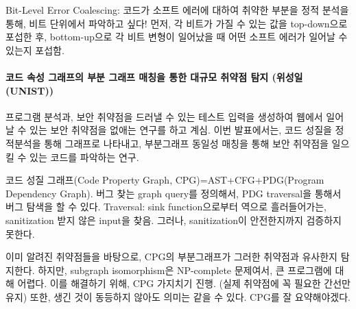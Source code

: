 \documentclass{article}
\begin{document}
Bit-Level Error Coalescing: 코드가 소프트 에러에 대하여 취약한 부분을 정적 분석을 통해, 비트 단위에서 파악하고 싶다!
먼저, 각 비트가 가질 수 있는 값을 top-down으로 포섭한 후, bottom-up으로 각 비트 변형이 일어났을 때 어떤 소프트 에러가 일어날 수 있는지 포섭함.
\paragraph{코드 속성 그래프의 부분 그래프 매칭을 통한 대규모 취약점 탐지 (위성일 (UNIST))}
프로그램 분석과, 보안 취약점을 드러낼 수 있는 테스트 입력을 생성하여 웹에서 일어날 수 있는 보안 취약점을 없애는 연구를 하고 계심.
이번 발표에서는, 코드 성질을 정적분석을 통해 그래프로 나타내고, 부분그래프 동일성 매칭을 통해 보안 취약점을 일으킬 수 있는 코드를 파악하는 연구.

코드 성질 그래프(Code Property Graph, CPG)=AST+CFG+PDG(Program Dependency Graph).
버그 찾는 graph query를 정의해서, PDG traversal을 통해서 버그 탐색을 할 수 있다.
Traversal: sink function으로부터 역으로 흘러들어가는, sanitization 받지 않은 input을 찾음.
그러나, sanitization이 안전한지까지 검증하지 못한다.

이미 알려진 취약점들을 바탕으로, CPG의 부분그래프가 그러한 취약점과 유사한지 탐지한다.
하지만, subgraph isomorphism은 NP-complete 문제여서, 큰 프로그램에 대해 어렵다.
이를 해결하기 위해, CPG 가지치기 진행. (실제 취약점에 꼭 필요한 간선만 유지)
또한, 생긴 것이 동등하지 않아도 의미는 같을 수 있다. CPG를 잘 요약해야겠다.
\end{document}
